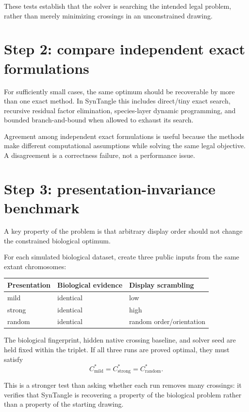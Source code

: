 \documentclass[11pt]{article}
\begin{document}
These tests establish that the solver is searching the intended legal problem,
rather than merely minimizing crossings in an unconstrained drawing.

\section{Step 2: compare independent exact formulations}

For sufficiently small cases, the same optimum should be recoverable by more
than one exact method.  In SynTangle this includes direct/tiny exact search,
recursive residual factor elimination, species-layer dynamic programming, and
bounded branch-and-bound when allowed to exhaust its search.

Agreement among independent exact formulations is useful because the methods
make different computational assumptions while solving the same legal
objective.  A disagreement is a correctness failure, not a performance issue.

\section{Step 3: presentation-invariance benchmark}

A key property of the problem is that arbitrary display order should not
change the constrained biological optimum.

For each simulated biological dataset, create three public inputs from the
same extant chromosomes:

\begin{center}
\begin{tabular}{lll}
\toprule
Presentation & Biological evidence & Display scrambling \\
\midrule
mild   & identical & low \\
strong & identical & high \\
random & identical & random order/orientation \\
\bottomrule
\end{tabular}
\end{center}

The biological fingerprint, hidden native crossing baseline, and solver seed
are held fixed within the triplet.  If all three runs are proved optimal, they
must satisfy
\[
 C^*_{\mathrm{mild}}
 =
 C^*_{\mathrm{strong}}
 =
 C^*_{\mathrm{random}}.
\]

This is a stronger test than asking whether each run removes many crossings:
it verifies that SynTangle is recovering a property of the biological problem
rather than a property of the starting drawing.
\end{document}
